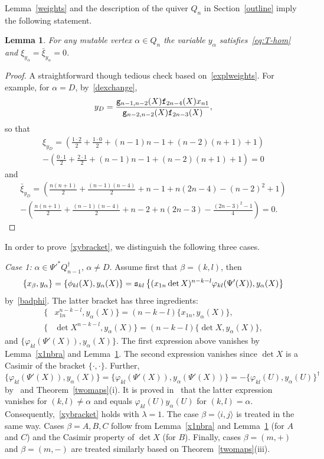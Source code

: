 \documentclass{amsart}
\newtheorem{lemma}[theorem]{Lemma}
\theoremstyle{definition}
\theoremstyle{remark}
\numberwithin{equation}{section}
\numberwithin{theorem}{section}
\def\ef{{\tt f}}
\def\eg{{\tt g}}
\def\es{{\tt s}}
\def\fy{\varphi}
\def\Poi{{\{{\cdot},{\cdot}\}}}
\begin{document}
Lemma~\ref{weights} and the description of the quiver $Q_n$ in Section~\ref{outline} imply the following statement.

\begin{lemma}\label{yweights}
For any mutable vertex $\alpha\in Q_n$ the variable $y_\alpha$ satisfies~\eqref{eq:T-hom} and $\xi_{y_\alpha}=\bar\xi_{y_\alpha}=0$.
\end{lemma}

\begin{proof} A straightforward though tedious check based on~\eqref{explweights}. For example, for $\alpha=D$, by~\eqref{dexchange},
\[
y_D=\frac{\eg_{n-1,n-2}(X)\ef_{2n-4}(X)x_{n1}}{\eg_{n-2,n-2}(X)\ef_{2n-3}(X)},
\]
so that 
\begin{multline*}
\xi_{y_D}=\left(\frac{1{\cdot} 2}2+\frac{1{\cdot} 0}2+(n-1)n-1+(n-2)(n+1)+1\right)\\
-\left(\frac{0{\cdot} 1}2+\frac{2{\cdot} 1}2+(n-1)n-1+(n-2)(n+1)+1\right)=0
\end{multline*}
and
\begin{multline*}
\bar\xi_{y_D}=\left(\frac{n(n+1)}2+\frac{(n-1)(n-4)}2+n-1+n(2n-4)-(n-2)^2+1\right)\\
-\left(\frac{n(n+1)}2+\frac{(n-1)(n-4)}2+n-2+n(2n-3)-\frac{(2n-3)^2-1}4\right)=0.
\end{multline*}
\end{proof} 

In order to prove~\eqref{xybracket}, we distinguish the following three cases.

{\it Case 1:\/} $\alpha\in\Psi'^*Q_{n-1}^\dag$, $\alpha\ne D$.  Assume first that $\beta=(k,l)$, then
\[
\{x_\beta,y_\alpha\}=\{\phi_{kl}(X),y_\alpha(X)\}=\es_{kl}\left\{(x_{1n}\det X)^{n-k-l}\fy_{kl}(\Psi'(X)),y_\alpha(X)\right\}
\]
by~\eqref{badphi}. The latter bracket has three ingredients: 
\begin{align*}
\{&x_{1n}^{n-k-l},y_\alpha(X)\}=(n-k-l)\{x_{1n},y_\alpha(X)\},\\
\{&\det X^{n-k-l},y_\alpha(X)\}=(n-k-l)\{\det X,y_\alpha(X)\},
\end{align*}
and $\{\fy_{kl} (\Psi'(X)),y_\alpha(X)\}$. The first expression above vanishes by Lemma~\ref{x1nbra} and Lemma~\ref{yweights}. The second expression vanishes since $\det X$ is a Casimir of the bracket $\Poi$. Further,
\[
\{\fy_{kl} (\Psi'(X)),y_\alpha(X)\}=\{\fy_{kl} (\Psi'(X)),y_\alpha(\Psi'(X))\}=-\{\fy_{kl} (U),y_\alpha(U)\}^\dag
\]
by~\cite[Proposition 4.1 and Remark 4.8]{GSVpullback} and Theorem~\ref{twomaps}(i). It is proved in~\cite[Section 6.2]{GSVdouble} that the latter expression
vanishes for $(k,l)\ne\alpha$ and equals $\fy_{kl} (U)y_\alpha(U)$ for $(k,l)=\alpha$. Consequently,~\eqref{xybracket} holds with $\lambda=1$.
The case $\beta=\langle i,j\rangle$ is treated in the same way. Cases $\beta=A, B,C$ follow from Lemma~\ref{x1nbra} and Lemma~\ref{yweights} (for $A$ and $C$) and the Casimir property of $\det X$ (for $B$). Finally, cases $\beta=(m,+)$ and $\beta=(m,-)$ are treated similarly
based on Theorem~\ref{twomaps}(iii).
\end{document}
